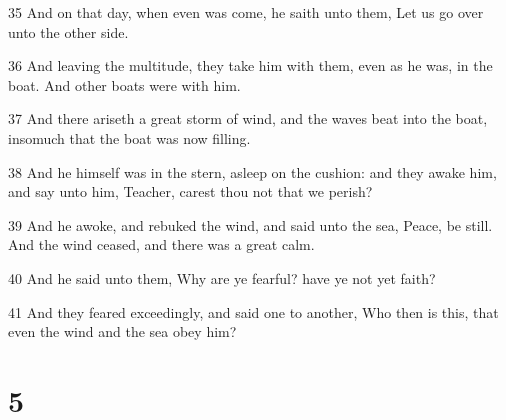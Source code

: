 \par 35 And on that day, when even was come, he saith unto them, Let us go over unto the other side.
\par 36 And leaving the multitude, they take him with them, even as he was, in the boat. And other boats were with him.
\par 37 And there ariseth a great storm of wind, and the waves beat into the boat, insomuch that the boat was now filling.
\par 38 And he himself was in the stern, asleep on the cushion: and they awake him, and say unto him, Teacher, carest thou not that we perish?
\par 39 And he awoke, and rebuked the wind, and said unto the sea, Peace, be still. And the wind ceased, and there was a great calm.
\par 40 And he said unto them, Why are ye fearful? have ye not yet faith?
\par 41 And they feared exceedingly, and said one to another, Who then is this, that even the wind and the sea obey him?

\chapter{5}

